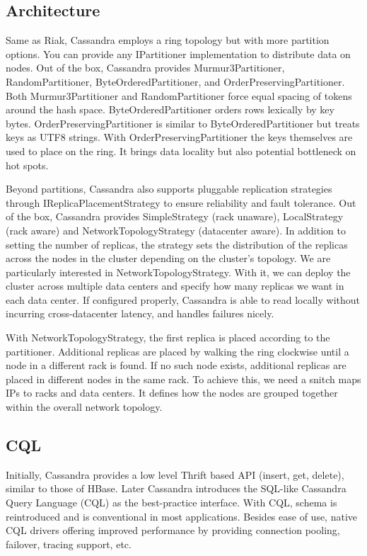 \documentclass[12pt]{book}
\begin{document}
\subsection{Architecture}

Same as Riak, Cassandra employs a ring topology but with more partition options. You can provide any IPartitioner implementation to distribute data on nodes. Out of the box, Cassandra provides Murmur3Partitioner, RandomPartitioner, ByteOrderedPartitioner, and OrderPreservingPartitioner. Both Murmur3Partitioner and RandomPartitioner  force equal spacing of tokens around the hash space. ByteOrderedPartitioner orders rows lexically by key bytes. OrderPreservingPartitioner is similar to ByteOrderedPartitioner but treats keys as UTF8 strings. With OrderPreservingPartitioner the keys themselves are used to place on the ring. It brings data locality but also potential bottleneck on hot spots.

Beyond partitions, Cassandra also supports pluggable replication strategies through IReplicaPlacementStrategy to ensure reliability and fault tolerance. Out of the box, Cassandra provides SimpleStrategy (rack unaware), LocalStrategy (rack aware) and NetworkTopologyStrategy (datacenter aware). In addition to setting the number of replicas, the strategy sets the distribution of the replicas across the nodes in the cluster depending on the cluster's topology. We are particularly interested in NetworkTopologyStrategy. With it, we can deploy the cluster across multiple data centers and specify how many replicas we want in each data center. If configured properly, Cassandra is able to read locally without incurring cross-datacenter latency, and handles failures nicely.

With NetworkTopologyStrategy, the first replica is placed according to the partitioner.
Additional replicas are placed by walking the ring clockwise until a node in a different rack is found. If no such node exists, additional replicas are placed in different nodes in the same rack.
To achieve this, we need a snitch maps IPs to racks and data centers. It defines how the nodes are grouped together within the overall network topology.

\subsection{CQL}
Initially, Cassandra provides a low level Thrift based API (insert, get, delete), similar to those of HBase. Later Cassandra introduces the SQL-like Cassandra Query Language (CQL) as the best-practice interface. With CQL, schema is reintroduced and is conventional in most applications. Besides ease of use, native CQL drivers offering improved performance by providing connection pooling, failover, tracing support, etc.
\end{document}
